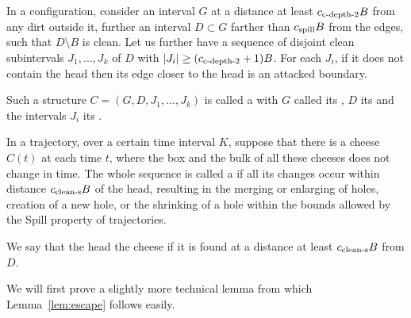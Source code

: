 \documentclass[12pt]{memoir}
\newcommand{\authnote}[3]
{\text{{ \textcolor{#3}{\( \langle\hspace{-0.2em}\langle \)\textsf{\footnotesize #1: #2}\( \rangle\hspace{-0.2em}\rangle \)}}}}
\newcommand{\authnote}[2]{}
\newcommand{\Pnote}[1]{{\authnote{P}{#1}{cyan}}}
\renewcommand{\le}{\leq}
\renewcommand{\ge}{\geq}
\def\B{B}
\def\G{G}
\newcommand{\cns}[1]{c_{\textrm{\upshape #1}}}
\newcommand{\cCleanS}{\cns{clean-s}}
\newcommand{\cCDepth}[1]{\cns{c-depth-#1}}
\newcommand{\cSpill}{\cns{spill}}
\begin{document}
\begin{definition}[Cheese]\label{def:cheese}
In a configuration, consider an interval \( \G \) 
at a distance at least \( \cCDepth2 \B \) from any dirt outside it, 
further an interval \( D\subset \G \) farther than
\(  \cSpill \B \) from the edges, such that \( D\setminus\B \) is clean.
Let us further have a sequence of disjoint clean
subintervals \( J_{1},\dots,J_{k} \) of \( D \)
with \( \abs{J_{i}}\ge (\cCDepth2 +1)\B \). %
For each \( J_{i} \), if it does not contain the head
then its edge closer to the head is an attacked boundary.

Such a structure \( C=(\G,D,J_{1},\dots,J_{k}) \) 
is called a  with \( \G \) called its , \( D \) its  and
the intervals \( J_{i} \)  its .
\Pnote{Picture?}


In a trajectory, over a certain time interval \( K \),
suppose that there is a cheese \( C(t) \) at each time \( t \), where the
box and the bulk of all these cheeses does not change in time.
The whole sequence is called a 
if all its changes occur within distance \( \cCleanS \B \) of the head, resulting
in the merging or enlarging of holes, creation of a new hole, or
the shrinking of a hole within the bounds allowed by the Spill property of trajectories.

We say that the head  the cheese if it is found at a distance at least
\( \cCleanS \B  \) from \( D \).
\end{definition}

We will first prove a slightly more technical lemma from which
Lemma~\ref{lem:escape} follows easily.
\end{document}
